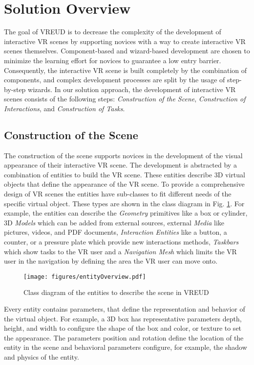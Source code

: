 \documentclass[conference]{IEEEtran}
\begin{document}
\section{Solution Overview}
The goal of VREUD is to decrease the complexity of the development of interactive \ac{VR} scenes by supporting novices with a way to create interactive VR scenes themselves. Component-based and wizard-based development are chosen to minimize the learning effort for novices to guarantee a low entry barrier. Consequently, the interactive \ac{VR} scene is built completely by the combination of components, and complex development processes are split by the usage of step-by-step wizards. In our solution approach, the development of interactive VR scenes consists of the following steps: \textit{Construction of the Scene}, \textit{Construction of Interactions}, and \textit{Construction of Tasks}. 

\subsection{Construction of the Scene}
The construction of the scene supports novices in the development of the visual appearance of their interactive VR scene. The development is abstracted by a combination of entities to build the VR scene. These entities describe 3D virtual objects that define the appearance of the VR scene. To provide a comprehensive design of VR scenes the entities have sub-classes to fit different needs of the specific virtual object. These types are shown in the class diagram in Fig. \ref{entities}. For example, the entities can describe the \textit{Geometry} primitives like a box or cylinder, 3D \textit{Models} which can be added from external sources, external \textit{Media} like pictures, videos, and PDF documents, \textit{Interaction Entities} like a button, a counter, or a pressure plate which provide new interactions methods, \textit{Taskbars} which show tasks to the \ac{VR} user and a \textit{Navigation Mesh} which limits the \ac{VR} user in the navigation by defining the area the \ac{VR} user can move onto.

\begin{figure}[htbp]
\centerline{\texttt{[image: figures/entityOverview.pdf]}}
\caption{Class diagram of the entities to describe the scene in VREUD}
\label{entities}
\end{figure}

Every entity contains parameters, that define the representation and behavior of the virtual object. For example, a 3D box has representative parameters depth, height, and width to configure the shape of the box and color, or texture to set the appearance. The parameters position and rotation define the location of the entity in the scene and behavioral parameters configure, for example, the shadow and physics of the entity.
\end{document}

